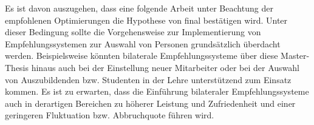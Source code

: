 Es ist davon auszugehen, dass eine folgende Arbeit unter Beachtung der empfohlenen Optimierungen die Hypothese von \textcite[S. 1ff.]{malinowski:2006} final bestätigen wird. Unter dieser Bedingung sollte die Vorgehensweise zur Implementierung von Empfehlungssystemen zur Auswahl von Personen grundsätzlich überdacht werden. Beispielsweise könnten bilaterale Empfehlungssysteme über diese Master-Thesis hinaus auch bei der Einstellung neuer Mitarbeiter oder bei der Auswahl von Auszubildenden bzw. Studenten in der Lehre unterstützend zum Einsatz kommen. Es ist zu erwarten, dass die Einführung bilateraler Empfehlungssysteme auch in derartigen Bereichen zu höherer Leistung und Zufriedenheit und einer geringeren Fluktuation bzw. Abbruchquote führen wird.
